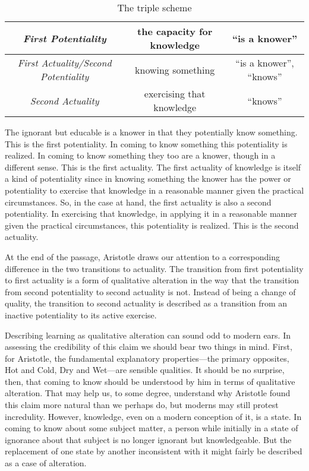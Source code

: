 \begin{table}[htbp]
	\footnotesize
	\centering
		\begin{tabular}{ccc}
			\hline
			\emph{First Potentiality} & the capacity for knowledge & ``is a knower''\\
			\hline
			\emph{First Actuality/Second Potentiality} & knowing something & ``is a knower'', ``knows''\\
			\hline
			\emph{Second Actuality} & exercising that knowledge & ``knows''\\
			\hline
		\end{tabular}
	\caption{The triple scheme}
	\label{tab:triple}
\end{table}

The ignorant but educable is a knower in that they potentially know something. This is the first potentiality. In coming to know something this potentiality is realized. In coming to know something they too are a knower, though in a different sense. This is the first actuality. The first actuality of knowledge is itself a kind of potentiality since in knowing something the knower has the power or potentiality to exercise that knowledge in a reasonable manner given the practical circumstances. So, in the case at hand, the first actuality is also a second potentiality. In exercising that knowledge, in applying it in a reasonable manner given the practical circumstances, this potentiality is realized. This is the second actuality. 

At the end of the passage, Aristotle draws our attention to a corresponding difference in the two transitions to actuality. The transition from first potentiality to first actuality is a form of qualitative alteration in the way that the transition from second potentiality to second actuality is not. Instead of being a change of quality, the transition to second actuality is described as a transition from an inactive potentiality to its active exercise.

Describing learning as qualitative alteration can sound odd to modern ears. In assessing the credibility of this claim we should bear two things in mind. First, for Aristotle, the fundamental explanatory properties---the primary opposites, Hot and Cold, Dry and Wet---are sensible qualities. It should be no surprise, then, that coming to know should be understood by him in terms of qualitative alteration. That may help us, to some degree, understand why Aristotle found this claim more natural than we perhaps do, but moderns may still protest incredulity. However, knowledge, even on a modern conception of it, is a state. In coming to know about some subject matter, a person while initially in a state of ignorance about that subject is no longer ignorant but knowledgeable. But the replacement of one state by another inconsistent with it might fairly be described as a case of alteration.

